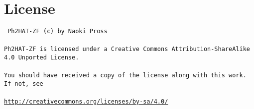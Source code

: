 \documentclass[a4paper, twocolumn]{article}
\numberwithin{equation}{section}
\theoremstyle{hsr-def}
\theoremstyle{hsr-sub}
\begin{document}
\section*{License}
{ \tt
Ph2HAT-ZF (c) by Naoki Pross
\\\\
Ph2HAT-ZF is licensed under a Creative Commons Attribution-ShareAlike 4.0 Unported License.
\\\\
You should have received a copy of the license along with this work. If not, see 
\\\\
{\small\url{http://creativecommons.org/licenses/by-sa/4.0/}}
}
\end{document}
